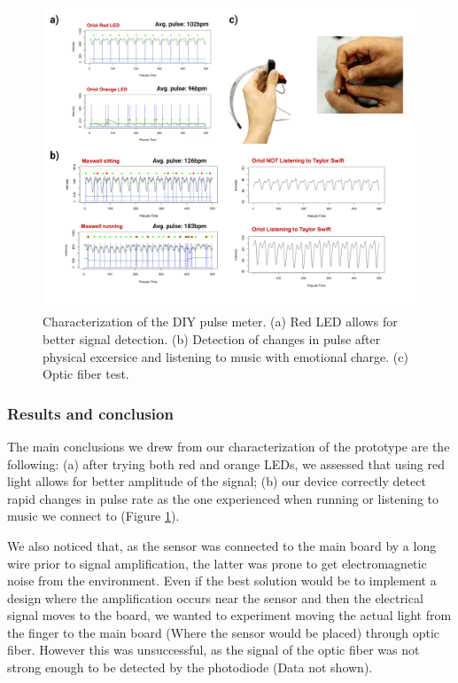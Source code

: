 \documentclass[conference]{IEEEtran}
\begin{document}
      \begin{figure}[!b]
         \centering
         \includegraphics[width=\linewidth]{images/pulse change.png}
         \caption{Characterization of the DIY pulse meter. (a) Red LED allows for better signal detection. (b) Detection of changes in pulse after physical excersice and listening to music with emotional charge. 
         (c) Optic fiber test.}
         \label{fig:pulsechange}
      \end{figure}


      \subsubsection{Results and conclusion}
      The main conclusions we drew from our characterization of the prototype are the following: (a) after trying both red and orange LEDs, 
      we assessed that using red light allows for better amplitude of the signal; (b) our device correctly detect rapid changes in pulse rate as 
      the one experienced when running or listening to music we connect to (Figure \ref{fig:pulsechange}).

      We also noticed that, as the sensor was connected to the main board by a long wire prior to signal amplification, the latter was prone 
      to get electromagnetic noise from the environment. Even if the best solution would be to implement a design where the amplification occurs 
      near the sensor and then the electrical signal moves to the board, we wanted to experiment moving the actual light from the finger to the 
      main board (Where the sensor would be placed) through optic fiber. However this was unsuccessful, as the signal of the optic fiber was not 
      strong enough to be detected by the photodiode (Data not shown). 
\end{document}
